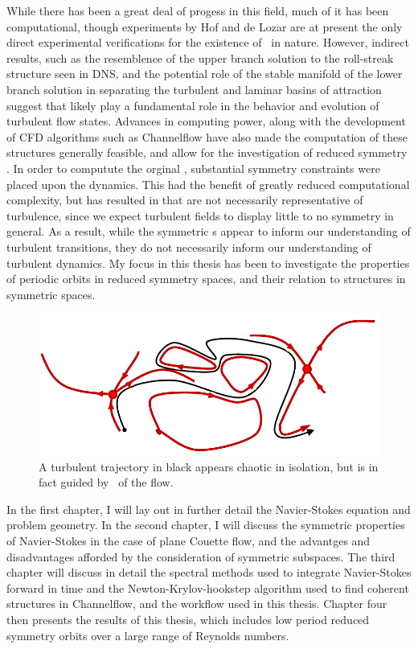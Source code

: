 While there has been a great deal of progess in this field, much of it has been computational, though experiments by Hof and de Lozar are at present the only direct experimental verifications for the existence of \ecs~in nature. However, indirect results, such as the resemblence of the upper branch solution to the roll-streak structure seen in DNS, and the potential role of the stable manifold of the lower branch solution in separating the turbulent and laminar basins of attraction suggest that \ecs likely play a fundamental role in the behavior and evolution of turbulent flow states. Advances in computing power, along with the development of CFD algorithms such as Channelflow have also made the computation of these structures generally feasible, and allow for the investigation of reduced symmetry \ecs. In order to computute the orginal \ecs, substantial symmetry constraints were placed upon the dynamics. This had the benefit of greatly reduced computational complexity, but has resulted in \ecs that are not necessarily representative of turbulence, since we expect turbulent fields to display little to no symmetry in general. As a result, while the symmetric \ecs s appear to inform our understanding of turbulent transitions, they do not necessarily inform our understanding of turbulent dynamics. My focus in this thesis has been to investigate the properties of periodic orbits in reduced symmetry spaces, and their relation to structures in symmetric spaces. 
 
\begin{figure}[h]
\centerline{
\includegraphics[scale=0.55]{Figs/phaseSpaceTraj}}
\caption{A turbulent trajectory in black appears chaotic in isolation, but is in fact guided by \ecs~of the flow.}\label{fig:guidedTurbulence}
\end{figure}
 In the first chapter, I will lay out in further detail the Navier-Stokes equation and problem geometry. In the second chapter, I will discuss the symmetric properties of Navier-Stokes in the case of plane Couette flow, and the advantges and disadvantages afforded by the consideration of symmetric subspaces. The third chapter will discuss in detail the spectral methods used to integrate Navier-Stokes forward in time and the Newton-Krylov-hookstep algorithm used to find coherent structures in Channelflow, and the workflow used in this thesis. Chapter four then presents the results of this thesis, which includes low period reduced symmetry orbits over a large range of Reynolds numbers.